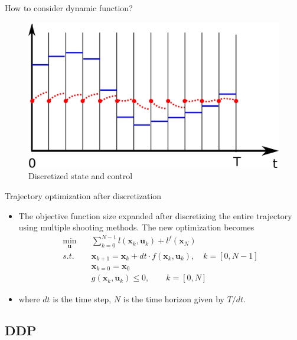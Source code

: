 \documentclass[10pt,compress]{beamer}
\begin{document}
\begin{frame}{How to consider dynamic function? }
\begin{minipage}[c]{0.45\linewidth}
    \begin{figure}[h]
        \includegraphics{images/xu_gap.png}
        \caption{Discretized state and control}
    \end{figure}
    \end{minipage}
\end{frame}

\begin{frame}{Trajectory optimization after discretization}

\begin{itemize}
    \item The objective function size expanded after discretizing the entire trajectory using multiple shooting methods. The new optimization becomes
    \begin{align}
        \min_{\textbf{u}} \quad & \sum^{N-1}_{k=0} l(\textbf{x}_k, \textbf{u}_k) + l^f(\textbf{x}_N) \\
        s.t. \quad & \textbf{x}_{k+1} = \textbf{x}_k + dt \cdot f(\textbf{x}_{k}, \textbf{u}_{k}), \quad k = [0, N-1] \\
        & \textbf{x}_{k=0} = \textbf{x}_0 \\
        & g(\textbf{x}_k, \textbf{u}_k) \leq 0, \quad\quad k=[0, N]
    \end{align}
    \item where  $dt$ is the time step, $N$ is the time horizon given by $T/dt$. 
\end{itemize}
    
\end{frame}

\subsection{DDP}
\end{document}
